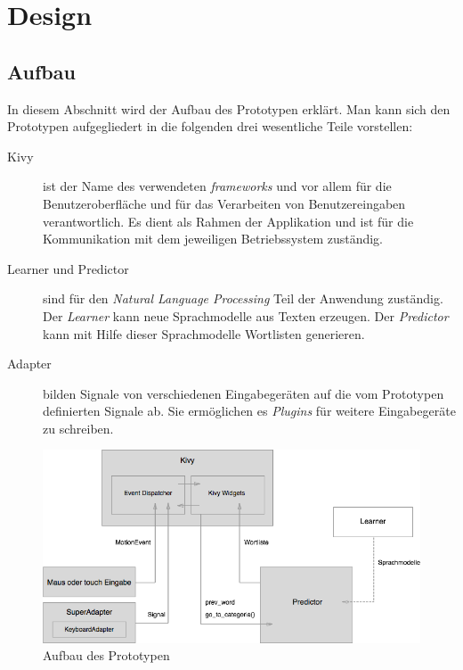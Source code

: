 \section{Design}
	
    \subsection{Aufbau}
    	In diesem Abschnitt wird der Aufbau des Prototypen erklärt. Man kann sich den Prototypen aufgegliedert in die folgenden drei wesentliche Teile vorstellen:
            
		\begin{description}
			\item[Kivy] ist der Name des verwendeten \emph{frameworks} und vor allem für die Benutzeroberfläche und für das Verarbeiten von Benutzereingaben verantwortlich. Es dient als Rahmen der Applikation und ist für die Kommunikation mit dem jeweiligen Betriebssystem zuständig.
        
        	\item[Learner und Predictor] sind für den \emph{Natural Language Processing} Teil der Anwendung zuständig. Der \emph{Learner} kann neue Sprachmodelle aus Texten erzeugen. Der \emph{Predictor} kann mit Hilfe dieser Sprachmodelle Wortlisten generieren. 
        
        	\item[Adapter] bilden Signale von verschiedenen Eingabegeräten auf die vom Prototypen definierten Signale ab. Sie ermöglichen es \emph{Plugins} für weitere Eingabegeräte zu schreiben.
		\end{description}
        
        \begin{figure}[H]
			\centering
            \includegraphics[width=.8\linewidth]{images/aufbau.png}
            \caption{Aufbau des Prototypen}
            \label{fig:architecture}
        \end{figure}
    
